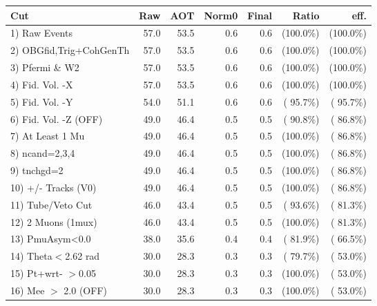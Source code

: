  \begin{table}[h!]\centering
 \begin{tabular}{||l||r|r|r|r|r|r||}
 \hline
 \hline
 Cut & Raw & AOT & Norm0 & Final & Ratio & eff.       \\
 \hline
  1) Raw Events           &         57.0 &         53.5 &          0.6 &          0.6 & (100.0\%) & (100.0\%) \\
  2) OBGfid,Trig+CohGenTh &         57.0 &         53.5 &          0.6 &          0.6 & (100.0\%) & (100.0\%) \\
  3) Pfermi \& W2         &         57.0 &         53.5 &          0.6 &          0.6 & (100.0\%) & (100.0\%) \\
  4) Fid. Vol. -X         &         57.0 &         53.5 &          0.6 &          0.6 & (100.0\%) & (100.0\%) \\
  5) Fid. Vol. -Y         &         54.0 &         51.1 &          0.6 &          0.6 & ( 95.7\%) & ( 95.7\%) \\
  6) Fid. Vol. -Z (OFF)   &         49.0 &         46.4 &          0.5 &          0.5 & ( 90.8\%) & ( 86.8\%) \\
  7) At Least 1 Mu        &         49.0 &         46.4 &          0.5 &          0.5 & (100.0\%) & ( 86.8\%) \\
  8) ncand=2,3,4          &         49.0 &         46.4 &          0.5 &          0.5 & (100.0\%) & ( 86.8\%) \\
  9) tnchgd=2             &         49.0 &         46.4 &          0.5 &          0.5 & (100.0\%) & ( 86.8\%) \\
 10) +/- Tracks (V0)      &         49.0 &         46.4 &          0.5 &          0.5 & (100.0\%) & ( 86.8\%) \\
 11) Tube/Veto Cut        &         46.0 &         43.4 &          0.5 &          0.5 & ( 93.6\%) & ( 81.3\%) \\
 12) 2 Muons (1mux)       &         46.0 &         43.4 &          0.5 &          0.5 & (100.0\%) & ( 81.3\%) \\
 13) PmuAsym<0.0          &         38.0 &         35.6 &          0.4 &          0.4 & ( 81.9\%) & ( 66.5\%) \\
 14) Theta$<$2.62 rad     &         30.0 &         28.3 &          0.3 &          0.3 & ( 79.7\%) & ( 53.0\%) \\
 15) Pt+wrt- $>$0.05      &         30.0 &         28.3 &          0.3 &          0.3 & (100.0\%) & ( 53.0\%) \\
 16) Mee $>$ 2.0  (OFF)   &         30.0 &         28.3 &          0.3 &          0.3 & (100.0\%) & ( 53.0\%) \\

\end{tabular}
\end{table}
